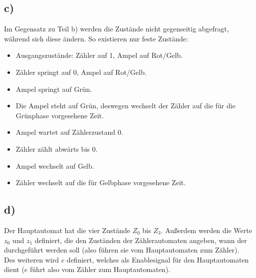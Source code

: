 \documentclass[a4paper]{scrartcl}
\begin{document}
	\subsection{c)}
		Im Gegensatz zu Teil b) werden die Zustände nicht gegenseitig abgefragt, während sich diese 
		ändern. So existieren nur feste Zustände: 
		\begin{itemize}
			\item Ausgangszustände: Zähler auf 1, Ampel auf Rot/Gelb. 
			\item Zähler springt auf 0, Ampel auf Rot/Gelb. 
			\item Ampel springt auf Grün. 
			\item Die Ampel steht auf Grün, deswegen wechselt der Zähler auf die für die Grünphase 
			vorgesehene	Zeit. 
			\item Ampel wartet auf Zählerzustand 0. 
			\item Zähler zählt abwärts bis 0. 
			\item Ampel wechselt auf Gelb. 
			\item Zähler wechselt auf die für Gelbphase vorgesehene Zeit.
		\end{itemize}
		

	\subsection{d)}
		Der Hauptautomat hat die vier Zustände $Z_0$ bis $Z_3$. Außerdem werden die Werte $z_0$ und 
		$z_1$ definiert, die den Zuständen der Zählerautomaten angeben, wann der durchgeführt werden
		soll (also führen sie vom Hauptautomaten zum Zähler). \\ 
		Des weiteren wird $e$ definiert, welches als Enablesignal für den Hauptautomaten dient ($e$ 
		führt also vom Zähler zum Hauptautomaten). 
		
\end{document}
